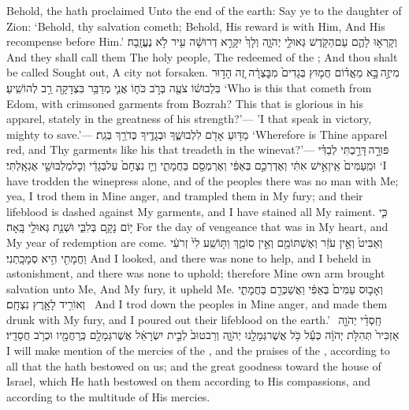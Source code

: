 {Behold, the \lord\space hath proclaimed Unto the end of the earth: Say ye to the daughter of Zion: ‘Behold, thy salvation cometh; Behold, His reward is with Him, And His recompense before Him.’}
{וְקָרְא֥וּ לָהֶ֛ם עַם\maqqaf הַקֹּ֖דֶשׁ גְּאוּלֵ֣י יְהֹוָ֑ה וְלָךְ֙ יִקָּרֵ֣א דְרוּשָׁ֔ה עִ֖יר לֹ֥א נֶעֱזָֽבָה׃ \setuma }
{And they shall call them The holy people, The redeemed of the \lord; And thou shalt be called Sought out, A city not forsaken.}
\newperek
{}
{מִי\maqqaf זֶ֣ה \legarmeh  בָּ֣א מֵאֱד֗וֹם חֲמ֤וּץ בְּגָדִים֙ מִבׇּצְרָ֔ה זֶ֚ה הָד֣וּר בִּלְבוּשׁ֔וֹ צֹעֶ֖ה בְּרֹ֣ב כֹּח֑וֹ אֲנִ֛י מְדַבֵּ֥ר בִּצְדָקָ֖ה רַ֥ב לְהוֹשִֽׁיעַ׃}
{‘Who is this that cometh from Edom, with crimsoned garments from Bozrah? This that is glorious in his apparel, stately in the greatness of his strength?’— ’I that speak in victory, mighty to save.’—}
{מַדּ֥וּעַ אָדֹ֖ם לִלְבוּשֶׁ֑ךָ וּבְגָדֶ֖יךָ כְּדֹרֵ֥ךְ בְּגַֽת׃}
{‘Wherefore is Thine apparel red, and Thy garments like his that treadeth in the winevat?’—}
{פּוּרָ֣ה \legarmeh  דָּרַ֣כְתִּי לְבַדִּ֗י וּמֵֽעַמִּים֙ אֵֽין\maqqaf אִ֣ישׁ אִתִּ֔י וְאֶדְרְכֵ֣ם בְּאַפִּ֔י וְאֶרְמְסֵ֖ם בַּחֲמָתִ֑י וְיֵ֤ז נִצְחָם֙ עַל\maqqaf בְּגָדַ֔י וְכׇל\maqqaf מַלְבּוּשַׁ֖י אֶגְאָֽלְתִּי׃}
{‘I have trodden the winepress alone, and of the peoples there was no man with Me; yea, I trod them in Mine anger, and trampled them in My fury; and their lifeblood is dashed against My garments, and I have stained all My raiment.}
{כִּ֛י י֥וֹם נָקָ֖ם בְּלִבִּ֑י וּשְׁנַ֥ת גְּאוּלַ֖י בָּֽאָה׃}
{For the day of vengeance that was in My heart, and My year of redemption are come.}
{וְאַבִּיט֙ וְאֵ֣ין עֹזֵ֔ר וְאֶשְׁתּוֹמֵ֖ם וְאֵ֣ין סוֹמֵ֑ךְ וַתּ֤וֹשַֽׁע לִי֙ זְרֹעִ֔י וַחֲמָתִ֖י הִ֥יא סְמָכָֽתְנִי׃}
{And I looked, and there was none to help, and I beheld in astonishment, and there was none to uphold; therefore Mine own arm brought salvation unto Me, And My fury, it upheld Me.}
{וְאָב֤וּס עַמִּים֙ בְּאַפִּ֔י וַאֲשַׁכְּרֵ֖ם בַּחֲמָתִ֑י וְאוֹרִ֥יד לָאָ֖רֶץ נִצְחָֽם׃ \setuma }
{And I trod down the peoples in Mine anger, and made them drunk with My fury, and I poured out their lifeblood on the earth.’}
{חַֽסְדֵ֨י יְהֹוָ֤ה \pasek  אַזְכִּיר֙ תְּהִלֹּ֣ת יְהֹוָ֔ה כְּעַ֕ל כֹּ֥ל אֲשֶׁר\maqqaf גְּמָלָ֖נוּ יְהֹוָ֑ה וְרַב\maqqaf טוּב֙ לְבֵ֣ית יִשְׂרָאֵ֔ל אֲשֶׁר\maqqaf גְּמָלָ֥ם כְּֽרַחֲמָ֖יו וּכְרֹ֥ב חֲסָדָֽיו׃}
{I will make mention of the mercies of the \lord, and the praises of the \lord, according to all that the \lord\space hath bestowed on us; and the great goodness toward the house of Israel, which He hath bestowed on them according to His compassions, and according to the multitude of His mercies.}
